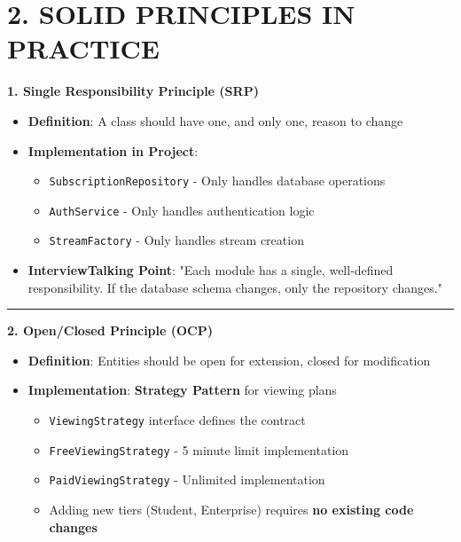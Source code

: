 \documentclass[10pt]{article}
\begin{document}
\section*{\color{primary} 2. SOLID PRINCIPLES IN PRACTICE}

\noindent
\begin{tcolorbox}[
  colback=white,
  colframe=dark,
  arc=3pt,
  boxrule=1pt,
  before skip=8pt,
  after skip=8pt
]

\textbf{1. Single Responsibility Principle (SRP)}
\begin{itemize}
\item \textbf{Definition}: A class should have one, and only one, reason to change
\item \textbf{Implementation in Project}:
  \begin{itemize}
  \item \texttt{SubscriptionRepository} - Only handles database operations
  \item \texttt{AuthService} - Only handles authentication logic
  \item \texttt{StreamFactory} - Only handles stream creation
  \end{itemize}
\item \textbf{InterviewTalking Point}: "Each module has a single, well-defined responsibility. If the database schema changes, only the repository changes."
\end{itemize}

\hrule

\textbf{2. Open/Closed Principle (OCP)}
\begin{itemize}
\item \textbf{Definition}: Entities should be open for extension, closed for modification
\item \textbf{Implementation}: \textbf{Strategy Pattern} for viewing plans
\begin{itemize}
\item \texttt{ViewingStrategy} interface defines the contract
\item \texttt{FreeViewingStrategy} - 5 minute limit implementation
\item \texttt{PaidViewingStrategy} - Unlimited implementation
\item Adding new tiers (Student, Enterprise) requires \textbf{no existing code changes}
\end{itemize}
\end{itemize}


\end{tcolorbox}
\end{document}
